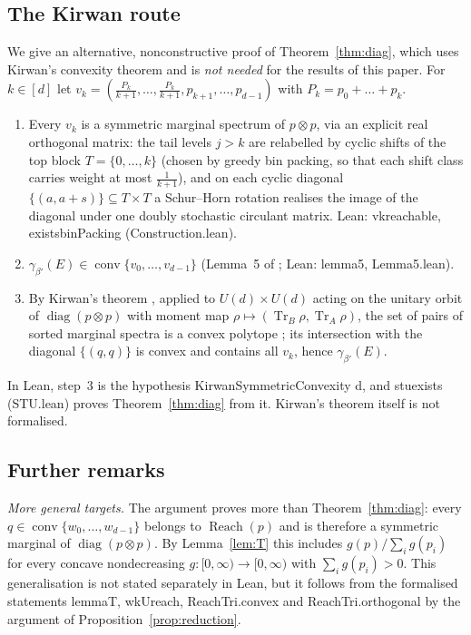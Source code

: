 \documentclass[11pt]{amsart}
\theoremstyle{definition}
\theoremstyle{remark}
\numberwithin{equation}{section}
\newcommand{\Tr}{\operatorname{Tr}}
\newcommand{\diag}{\operatorname{diag}}
\newcommand{\conv}{\operatorname{conv}}
\newcommand{\Reach}{\operatorname{Reach}}
\newcommand{\leanus}{\textunderscore\allowbreak}
\newcommand{\lean}[1]{{\ttfamily\let\_\leanus #1}}
\begin{document}
\subsection{The Kirwan route}\label{sec:kirwan}
We give an alternative, nonconstructive proof of Theorem~\ref{thm:diag}, which uses Kirwan's convexity theorem and is
\emph{not needed} for the results of this paper. For $k\in[d]$ let
$v_k=(\frac{P_k}{k+1},\dots,\frac{P_k}{k+1},p_{k+1},\dots,p_{d-1})$ with $P_k=p_0+\dots+p_k$.
\begin{enumerate}
\item Every $v_k$ is a symmetric marginal spectrum of $p\otimes p$, via an explicit real orthogonal
matrix: the tail levels $j>k$ are relabelled by cyclic shifts of the top block $T=\{0,\dots,k\}$ (chosen
by greedy bin packing, so that each shift class carries weight at most $\frac1{k+1}$), and on each cyclic
diagonal $\{(a,a+s)\}\subseteq T\times T$ a Schur--Horn rotation realises the image of the diagonal
under one doubly stochastic circulant matrix. Lean: \lean{vk\_reachable}, \lean{exists\_binPacking}
(\lean{Construction.lean}).
\item $\gamma_{\beta'}(E)\in\conv\{v_0,\dots,v_{d-1}\}$ (Lemma~5 of \cite{BakhshinezhadEtAl2019}; Lean:
\lean{lemma5}, \lean{Lemma5.lean}).
\item By Kirwan's theorem \cite{Kirwan1984}, applied to $U(d)\times U(d)$ acting on the unitary orbit of
$\diag(p\otimes p)$ with moment map $\rho\mapsto(\Tr_B\rho,\Tr_A\rho)$, the set of pairs of sorted marginal
spectra is a convex polytope \cite{Klyachko2004,ChristandlMitchison2006}; its intersection with the
diagonal $\{(q,q)\}$ is convex and contains all $v_k$, hence $\gamma_{\beta'}(E)$.
\end{enumerate}
In Lean, step~3 is the hypothesis \lean{KirwanSymmetricConvexity d}, and \lean{stu\_exists}
(\lean{STU.lean}) proves Theorem~\ref{thm:diag} from it. Kirwan's theorem itself is not formalised.

\subsection{Further remarks}
\emph{More general targets.} The argument proves more than Theorem~\ref{thm:diag}: every
$q\in\conv\{w_0,\dots,w_{d-1}\}$ belongs to $\Reach(p)$ and is therefore a symmetric marginal of
$\diag(p\otimes p)$. By Lemma~\ref{lem:T} this includes $g(p)/\sum_ig(p_i)$ for every concave nondecreasing
$g:[0,\infty)\to[0,\infty)$ with $\sum_ig(p_i)>0$. This generalisation is not stated separately in Lean,
but it follows from the formalised statements \lean{lemmaT}, \lean{wkU\_reach}, \lean{ReachTri.convex}
and \lean{ReachTri.orthogonal} by the argument of Proposition~\ref{prop:reduction}.
\end{document}
